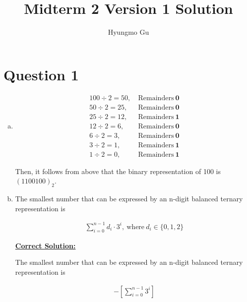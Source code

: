 \documentclass[12pt]{article}
\begin{document}
\title{Midterm 2 Version 1 Solution}
\author{Hyungmo Gu}
\maketitle

\section*{Question 1}
\begin{enumerate}[a.]
    \item

    \begin{align*}
        100 \div 2 = 50,\:&\text{Remainders}\:\textbf{0}\\
        50 \div 2 = 25,\:&\text{Remainders}\:\textbf{0}\\
        25 \div 2 = 12,\:&\text{Remainders}\:\textbf{1}\\
        12 \div 2 = 6,\:&\text{Remainders}\:\textbf{0}\\
        6 \div 2 = 3,\:&\text{Remainders}\:\textbf{0}\\
        3 \div 2 = 1,\:&\text{Remainders}\:\textbf{1}\\
        1 \div 2 = 0,\:&\text{Remainders}\:\textbf{1}
    \end{align*}

    \bigskip

    Then, it follows from above that the binary representation of 100 is $(1100100)_2$.

    \item The smallest number that can be expressed by an n-digit balanced ternary
    representation is

    \begin{align}
        \sum\limits_{i=0}^{n-1} d_i \cdot 3^i,\:\text{where}\:d_i \in \{0,1,2\}
    \end{align}

    \bigskip

    \begin{mdframed}
        \underline{\textbf{Correct Solution:}}

        \bigskip

        The smallest number that can be expressed by an n-digit balanced ternary
        representation is

        \setcounter{equation}{0}
        \color{red}
        \begin{align}
            -\left[ \sum\limits_{i=0}^{n-1} 3^i \right]
        \end{align}
        \color{black}
    \end{mdframed}


\end{enumerate}
\end{document}
